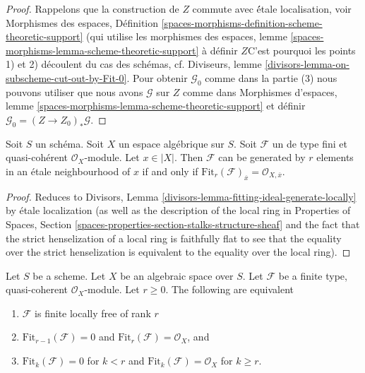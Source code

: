\begin{proof}
Rappelons que la construction de $Z$ commute avec \'étale localisation, voir
Morphismes des espaces, Définition
\ref{spaces-morphisms-definition-scheme-theoretic-support}
(qui utilise les morphismes des espaces, lemme
\ref{spaces-morphisms-lemma-scheme-theoretic-support}
à définir $Z$C'est pourquoi les points 1) et 2) découlent du cas des schémas, cf.
Diviseurs, lemme \ref{divisors-lemma-on-subscheme-cut-out-by-Fit-0}.
Pour obtenir $\mathcal{G}_0$ comme dans la partie (3) nous pouvons utiliser
que nous avons $\mathcal{G}$ sur $Z$ comme dans Morphismes d'espaces, lemme
\ref{spaces-morphisms-lemma-scheme-theoretic-support}
et définir $\mathcal{G}_0 = (Z \to Z_0)_*\mathcal{G}$.
\end{proof}

\begin{lemma}
\label{lemma-fitting-ideal-generate-locally}
Soit $S$ un schéma. Soit $X$ un espace algébrique sur $S$.
Soit $\mathcal{F}$ un de type fini et quasi-cohérent
$\mathcal{O}_X$-module. Let $x \in |X|$. Then $\mathcal{F}$ can be
generated by $r$ elements in an \'etale neighbourhood of $x$ if and only
if $\text{Fit}_r(\mathcal{F})_{\overline{x}} = \mathcal{O}_{X, \overline{x}}$.
\end{lemma}

\begin{proof}
Reduces to
Divisors, Lemma \ref{divisors-lemma-fitting-ideal-generate-locally}
by \'etale localization (as well as the description of the local
ring in Properties of Spaces, Section
\ref{spaces-properties-section-stalks-structure-sheaf}
and the fact that the strict henselization of a local ring
is faithfully flat to see that the equality over the strict
henselization is equivalent to the equality over the local ring).
\end{proof}

\begin{lemma}
\label{lemma-fitting-ideal-finite-locally-free}
Let $S$ be a scheme. Let $X$ be an algebraic space over $S$.
Let $\mathcal{F}$ be a finite type, quasi-coherent
$\mathcal{O}_X$-module. Let $r \geq 0$. The following are equivalent
\begin{enumerate}
\item $\mathcal{F}$ is finite locally free of rank $r$
\item $\text{Fit}_{r - 1}(\mathcal{F}) = 0$ and
$\text{Fit}_r(\mathcal{F}) = \mathcal{O}_X$, and
\item $\text{Fit}_k(\mathcal{F}) = 0$ for $k < r$ and
$\text{Fit}_k(\mathcal{F}) = \mathcal{O}_X$ for $k \geq r$.
\end{enumerate}
\end{lemma}

